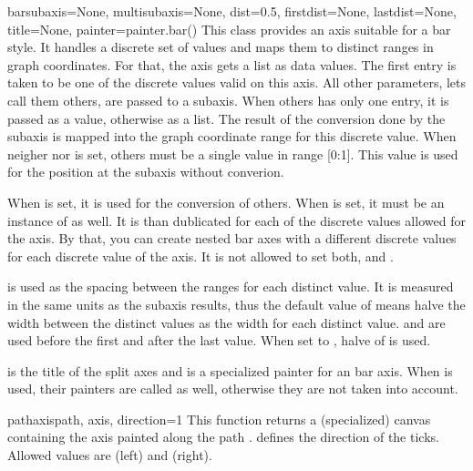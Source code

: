 \begin{classdesc}{bar}{subaxis=None, multisubaxis=None,
                       dist=0.5, firstdist=None, lastdist=None,
                       title=None, painter=painter.bar()}
  This class provides an axis suitable for a bar style. It handles a
  discrete set of values and maps them to distinct ranges in graph
  coordinates. For that, the axis gets a list as data values. The
  first entry is taken to be one of the discrete values valid on this
  axis. All other parameters, lets call them others, are passed to a
  subaxis. When others has only one entry, it is passed as a value,
  otherwise as a list. The result of the conversion done by the
  subaxis is mapped into the graph coordinate range for this discrete
  value. When neigher  nor  is set,
  others must be a single value in range [0:1]. This value is used for
  the position at the subaxis without converion.

  When  is set, it is used for the conversion of others.
  When  is set, it must be an instance of 
  as well. It is than dublicated for each of the discrete values
  allowed for the axis. By that, you can create nested bar axes with
  a different discrete values for each discrete value of the axis. It
  is not allowed to set both,  and .

   is used as the spacing between the ranges for each
  distinct value. It is measured in the same units as the subaxis
  results, thus the default value of  means halve the width
  between the distinct values as the width for each distinct value.
   and  are used before the first and
  after the last value. When set to , halve of 
  is used.

   is the title of the split axes and  is a
  specialized painter for an bar axis. When  is
  used, their painters are called as well, otherwise they are not
  taken into account.
\end{classdesc}

\begin{funcdesc}{pathaxis}{path, axis, direction=1}
  This function returns a (specialized) canvas containing the axis
   painted along the path . 
  defines the direction of the ticks. Allowed values are 
  (left) and  (right).
\end{funcdesc}

